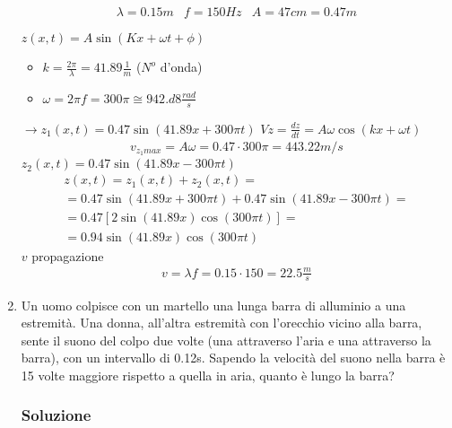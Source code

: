 \documentclass{report}
\begin{document}
\begin{enumerate}
\begin{eqnarray*}
  \lambda=0.15m & f=150Hz & A=47cm =0.47m
\end{eqnarray*}
\begin{tasks}
  \task $z(x,t)=A\sin(Kx+\omega t + \phi)$
  \begin{itemize}
  \item $k=\frac{2\pi}{\lambda}=41.89\frac{1}{m}$ ($N^o$ d'onda)
  \item $\omega=2\pi f=300\pi\cong 942.d8 \frac{rad}{s}$
  \end{itemize}
  $\to{} z_1(x,t)=0.47\sin(41.89x+300\pi t)$
  \task $Vz=\frac{dz}{dt}= A\omega \cos (kx+\omega t)$
  \begin{eqnarray*}
    v_{z_1max}=A\omega=0.47\cdot 300\pi = 443.22 m/s
  \end{eqnarray*}
  \task $z_2(x,t)=0.47\sin(41.89x-300\pi t)$
  \begin{eqnarray*}
    z(x,t)= z_1(x,t)+z_2(x,t)=\\
    =0.47\sin(41.89x+300\pi t)+0.47\sin(41.89x-300\pi t)=\\
    =0.47[2\sin (41.89x) \cos (300\pi t)]=\\
    =0.94\sin(41.89x)\cos(300\pi t)
  \end{eqnarray*}
  \task $v$ propagazione
  \begin{eqnarray*}
    v=\lambda f = 0.15\cdot 150=22.5\frac{m}{s}
  \end{eqnarray*}
\end{tasks} 
\item Un uomo colpisce con un martello una lunga barra di alluminio a una
  estremità. Una donna, all'altra estremità con l'orecchio vicino alla barra,
  sente il suono del colpo due volte (una attraverso l'aria e una attraverso la
  barra), con un intervallo di 0.12s. Sapendo la velocità del suono nella barra è
  15 volte maggiore rispetto a quella in aria, quanto è lungo la barra?
  
\subsubsection{Soluzione}
\label{sec:sol14}


\end{enumerate}
\end{document}
